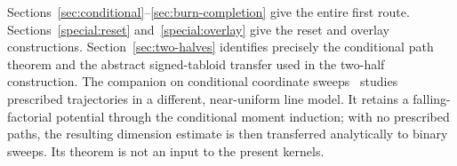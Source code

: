 Sections~\ref{sec:conditional}--\ref{sec:burn-completion} give the entire first route. Sections~\ref{special:reset} and~\ref{special:overlay} give the reset and overlay constructions. Section~\ref{sec:two-halves} identifies precisely the conditional path theorem and the abstract signed-tabloid transfer used in the two-half construction. The companion on conditional coordinate sweeps~\cite{conditional-sweeps} studies prescribed trajectories in a different, near-uniform line model. It retains a falling-factorial potential through the conditional moment induction; with no prescribed paths, the resulting dimension estimate is then transferred analytically to binary sweeps. Its theorem is not an input to the present kernels.
